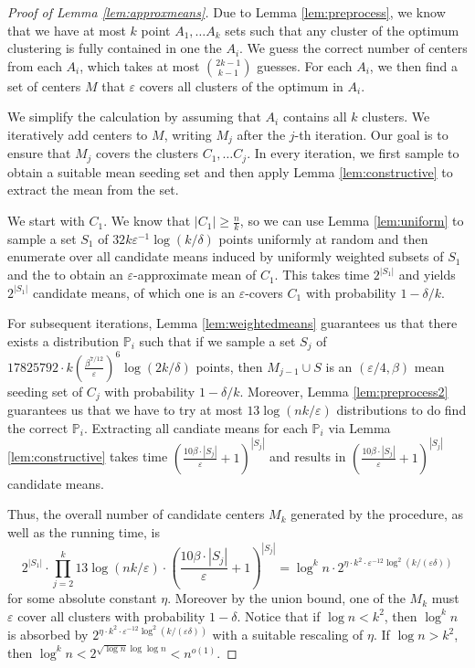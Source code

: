 \documentclass[11pt]{article}
\begin{document}
\begin{proof}[Proof of Lemma \ref{lem:approxmeans}]
Due to Lemma \ref{lem:preprocess}, we know that we have at most $k$ point $A_1,\ldots A_k$ sets such that any cluster of the optimum clustering is fully contained in one the $A_i$.
We guess the correct number of centers from each $A_i$, which takes at most ${2k-1 \choose k-1}$ guesses.
For each $A_i$, we then find a set of centers $M$ that $\varepsilon$ covers all clusters of the optimum in $A_i$.

We simplify the calculation by assuming that $A_i$ contains all $k$ clusters.
We iteratively add centers to $M$, writing $M_j$ after the $j$-th iteration. Our goal is to ensure that $M_j$ covers the clusters $C_1,\ldots C_j$.
In every iteration, we first sample to obtain a suitable mean seeding set and then apply Lemma \ref{lem:constructive} to extract the mean from the set.

We start with $C_1$. We know that $|C_1|\geq \frac{n}{k}$, so we can use Lemma \ref{lem:uniform} to sample a set $S_1$ of $32 k\varepsilon^{-1}\log(k/\delta)$ points uniformly at random and then enumerate over all candidate means induced by uniformly weighted subsets of $S_1$ and the to obtain an $\varepsilon$-approximate mean of $C_1$. This takes time $2^{|S_1|}$  and yields $2^{|S_1|}$ candidate means, of which one is an $\varepsilon$-covers $C_1$ with probability $1-\delta/k$.

For subsequent iterations, Lemma \ref{lem:weightedmeans} guarantees us that there exists a distribution $\mathbb{P}_i$ such that if we sample a set $S_j$ of $17825792 \cdot k\left(\frac{\beta^{7/12}}{\varepsilon}\right)^6 \log(2k/\delta)$ points, then $M_{j-1}\cup S$ is an $(\varepsilon/4,\beta)$ mean seeding set of $C_j$ with probability $1-\delta/k$. Moreover, Lemma \ref{lem:preprocess2} guarantees us that we have to try at most $13\log(nk/\varepsilon)$ distributions to do find the correct $\mathbb{P}_i$.
Extracting all candiate means for each $\mathbb{P}_i$ via Lemma \ref{lem:constructive} takes time $\left(\frac{10\beta\cdot |S_j|}{\varepsilon}+1\right)^{|S_j|}$ and results in $\left(\frac{10\beta\cdot |S_j|}{\varepsilon}+1\right)^{|S_j|}$ candidate means.

Thus, the overall number of candidate centers $M_k$ generated by the procedure, as well as the running time, is
$$2^{|S_1|}\cdot \prod_{j=2}^k 13\log(nk/\varepsilon) \cdot \left(\frac{10\beta\cdot |S_j|}{\varepsilon}+1\right)^{|S_j|} = \log^k n \cdot 2^{\eta\cdot k^2 \cdot \varepsilon^{-12} \log^2(k/(\varepsilon\delta))}$$
for some absolute constant $\eta$.
Moreover by the union bound, one of the $M_k$ must $\varepsilon$ cover all clusters with probability $1-\delta$.
Notice that if $\log n < k^2$, then $\log^k n$ is absorbed by $2^{\eta\cdot k^2 \cdot \varepsilon^{-12} \log^2(k/(\varepsilon\delta))}$ with a suitable rescaling of $\eta$. If $\log n>k^2$, then $\log^k n <2^{\sqrt{\log n}\log\log n}<n^{o(1)}$.


\end{proof}
\end{document}
